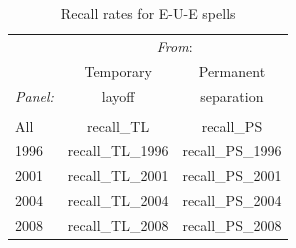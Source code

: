 \documentclass[12pt]{article}
\begin{document}

    \begin{table}
      \caption{Recall rates for E-U-E spells}
      \begin{center}
\begin{tabular}{l|cc}
  \hline \hline
   & \multicolumn{2}{c}{\textit{From}:} \\[0.35em]
                                     &\multicolumn{1}{c}{Temporary} & \multicolumn{1}{c}{Permanent} \\
   \textit{Panel:}                                  
                                     &\multicolumn{1}{c}{layoff} & 
                                     \multicolumn{1}{c}{separation} 
                                     \\[0.35em]
                                     \hline \\[-1em]
  All  & recall_TL & recall_PS \\[.35em]
  1996 & recall_TL_1996 & recall_PS_1996 \\[.35em]
  2001 & recall_TL_2001 & recall_PS_2001 \\[.35em]
  2004 & recall_TL_2004 & recall_PS_2004 \\[.35em]
  2008 & recall_TL_2008 & recall_PS_2008 \\[.35em]
               \hline
\end{tabular}
      \end{center}
    \end{table}
\end{document}
